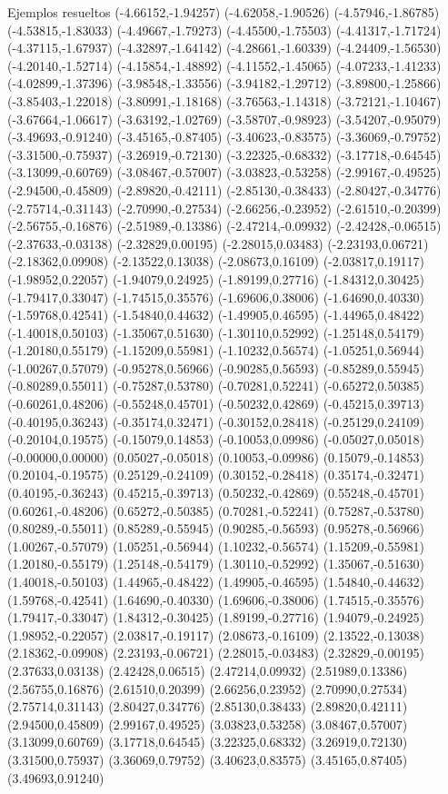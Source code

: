 \documentclass[11pt,a4paper]{article}
\begin{document}
\begin{fmex}{Ejemplos resueltos}
(-4.66152,-1.94257) (-4.62058,-1.90526) (-4.57946,-1.86785) (-4.53815,-1.83033) (-4.49667,-1.79273) (-4.45500,-1.75503) (-4.41317,-1.71724) (-4.37115,-1.67937) (-4.32897,-1.64142) (-4.28661,-1.60339) (-4.24409,-1.56530) (-4.20140,-1.52714) (-4.15854,-1.48892) (-4.11552,-1.45065) (-4.07233,-1.41233) (-4.02899,-1.37396) (-3.98548,-1.33556) (-3.94182,-1.29712) (-3.89800,-1.25866) (-3.85403,-1.22018) (-3.80991,-1.18168) (-3.76563,-1.14318) (-3.72121,-1.10467) (-3.67664,-1.06617) (-3.63192,-1.02769) (-3.58707,-0.98923) (-3.54207,-0.95079) (-3.49693,-0.91240) (-3.45165,-0.87405) (-3.40623,-0.83575) (-3.36069,-0.79752) (-3.31500,-0.75937) (-3.26919,-0.72130) (-3.22325,-0.68332) (-3.17718,-0.64545) (-3.13099,-0.60769) (-3.08467,-0.57007) (-3.03823,-0.53258) (-2.99167,-0.49525) (-2.94500,-0.45809) (-2.89820,-0.42111) (-2.85130,-0.38433) (-2.80427,-0.34776) (-2.75714,-0.31143) (-2.70990,-0.27534) (-2.66256,-0.23952) (-2.61510,-0.20399) (-2.56755,-0.16876) (-2.51989,-0.13386) (-2.47214,-0.09932) (-2.42428,-0.06515) (-2.37633,-0.03138) (-2.32829,0.00195) (-2.28015,0.03483) (-2.23193,0.06721) (-2.18362,0.09908) (-2.13522,0.13038) (-2.08673,0.16109) (-2.03817,0.19117) (-1.98952,0.22057) (-1.94079,0.24925) (-1.89199,0.27716) (-1.84312,0.30425) (-1.79417,0.33047) (-1.74515,0.35576) (-1.69606,0.38006) (-1.64690,0.40330) (-1.59768,0.42541) (-1.54840,0.44632) (-1.49905,0.46595) (-1.44965,0.48422) (-1.40018,0.50103) (-1.35067,0.51630) (-1.30110,0.52992) (-1.25148,0.54179) (-1.20180,0.55179) (-1.15209,0.55981) (-1.10232,0.56574) (-1.05251,0.56944) (-1.00267,0.57079) (-0.95278,0.56966) (-0.90285,0.56593) (-0.85289,0.55945) (-0.80289,0.55011) (-0.75287,0.53780) (-0.70281,0.52241) (-0.65272,0.50385) (-0.60261,0.48206) (-0.55248,0.45701) (-0.50232,0.42869) (-0.45215,0.39713) (-0.40195,0.36243) (-0.35174,0.32471) (-0.30152,0.28418) (-0.25129,0.24109) (-0.20104,0.19575) (-0.15079,0.14853) (-0.10053,0.09986) (-0.05027,0.05018) (-0.00000,0.00000) (0.05027,-0.05018) (0.10053,-0.09986) (0.15079,-0.14853) (0.20104,-0.19575) (0.25129,-0.24109) (0.30152,-0.28418) (0.35174,-0.32471) (0.40195,-0.36243) (0.45215,-0.39713) (0.50232,-0.42869) (0.55248,-0.45701) (0.60261,-0.48206) (0.65272,-0.50385) (0.70281,-0.52241) (0.75287,-0.53780) (0.80289,-0.55011) (0.85289,-0.55945) (0.90285,-0.56593) (0.95278,-0.56966) (1.00267,-0.57079) (1.05251,-0.56944) (1.10232,-0.56574) (1.15209,-0.55981) (1.20180,-0.55179) (1.25148,-0.54179) (1.30110,-0.52992) (1.35067,-0.51630) (1.40018,-0.50103) (1.44965,-0.48422) (1.49905,-0.46595) (1.54840,-0.44632) (1.59768,-0.42541) (1.64690,-0.40330) (1.69606,-0.38006) (1.74515,-0.35576) (1.79417,-0.33047) (1.84312,-0.30425) (1.89199,-0.27716) (1.94079,-0.24925) (1.98952,-0.22057) (2.03817,-0.19117) (2.08673,-0.16109) (2.13522,-0.13038) (2.18362,-0.09908) (2.23193,-0.06721) (2.28015,-0.03483) (2.32829,-0.00195) (2.37633,0.03138) (2.42428,0.06515) (2.47214,0.09932) (2.51989,0.13386) (2.56755,0.16876) (2.61510,0.20399) (2.66256,0.23952) (2.70990,0.27534) (2.75714,0.31143) (2.80427,0.34776) (2.85130,0.38433) (2.89820,0.42111) (2.94500,0.45809) (2.99167,0.49525) (3.03823,0.53258) (3.08467,0.57007) (3.13099,0.60769) (3.17718,0.64545) (3.22325,0.68332) (3.26919,0.72130) (3.31500,0.75937) (3.36069,0.79752) (3.40623,0.83575) (3.45165,0.87405) (3.49693,0.91240) 
\end{fmex}
\end{document}
